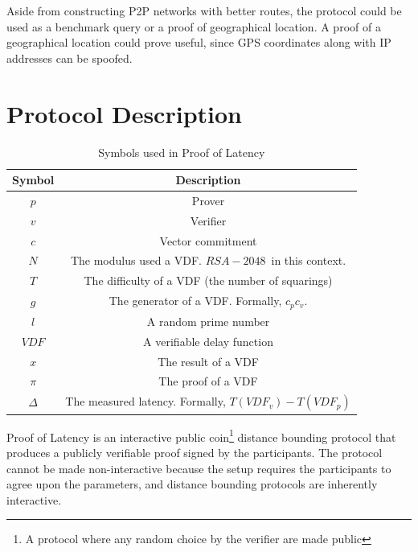 Aside from constructing P2P networks with better routes, the protocol could be used as a benchmark query or a proof of geographical location. A proof of a geographical location could prove useful, since GPS coordinates along with IP addresses can be spoofed.

\section{Protocol Description}
\begin{table}[h!]
  \centering
  \begin{tabular}{ c|c  }
    Symbol     & Description                                             \\
    \hline
    \( p \)    & Prover                                                  \\
    \( v \)    & Verifier                                                \\
    \( c \)    & Vector commitment                                       \\
    \( N \)    & The modulus used a VDF. \(RSA-2048\)~in this context.   \\

    \( T \)    & The difficulty of a VDF (the number of squarings)       \\
    \( g \)    & The generator of a VDF. Formally, \(c_p c_v\).          \\
    \( l \)    & A random prime number                                   \\
    \( VDF \)  & A verifiable delay function                             \\
    \( x \)    & The result of a VDF                                     \\
    \(\pi \)   & The proof of a VDF                                      \\
    \(\Delta\) & The measured latency. Formally, \(T(VDF_v) - T(VDF_p)\) \\
  \end{tabular}
  \caption{Symbols used in Proof of Latency}
  \label{table:1}
\end{table}

Proof of Latency is an interactive public coin\footnote{A protocol where any random choice by the verifier are made public} distance bounding protocol that produces a publicly verifiable proof signed by the participants. The protocol cannot be made non-interactive because the setup requires the participants to agree upon the parameters, and distance bounding protocols are inherently interactive.


